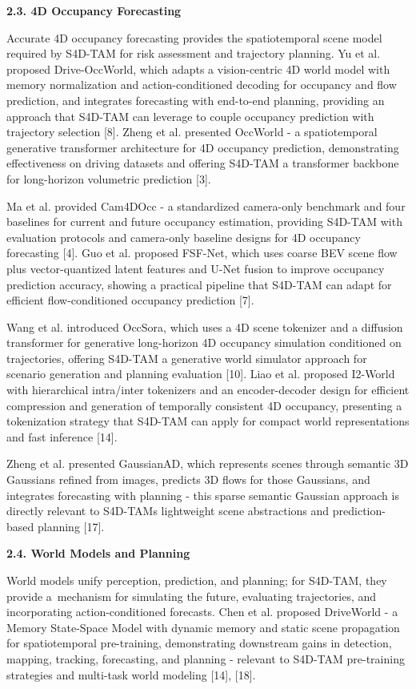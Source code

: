 \documentclass[
]{article}
\begin{document}
\textbf{2.3. 4D Occupancy Forecasting}

Accurate 4D occupancy forecasting provides the spatiotemporal scene
model required by S4D-TAM for risk assessment and trajectory planning.
Yu et al. proposed Drive-OccWorld, which adapts a vision-centric 4D
world model with memory normalization and action-conditioned decoding
for occupancy and flow prediction, and integrates forecasting with
end-to-end planning, providing an approach that S4D-TAM can leverage to
couple occupancy prediction with trajectory selection {[}8{]}. Zheng et
al. presented OccWorld - a spatiotemporal generative transformer
architecture for 4D occupancy prediction, demonstrating effectiveness on
driving datasets and offering S4D-TAM a transformer backbone for
long-horizon volumetric prediction {[}3{]}.

Ma et al. provided Cam4DOcc - a standardized camera-only benchmark and
four baselines for current and future occupancy estimation, providing
S4D-TAM with evaluation protocols and camera-only baseline designs for
4D occupancy forecasting {[}4{]}. Guo et al. proposed FSF-Net, which
uses coarse BEV scene flow plus vector-quantized latent features and
U-Net fusion to improve occupancy prediction accuracy, showing a
practical pipeline that S4D-TAM can adapt for efficient flow-conditioned
occupancy prediction {[}7{]}.

Wang et al. introduced OccSora, which uses a 4D scene tokenizer and a
diffusion transformer for generative long-horizon 4D occupancy
simulation conditioned on trajectories, offering S4D-TAM a generative
world simulator approach for scenario generation and planning evaluation
{[}10{]}. Liao et al. proposed I2-World with hierarchical intra/inter
tokenizers and an encoder-decoder design for efficient compression and
generation of temporally consistent 4D occupancy, presenting a
tokenization strategy that S4D-TAM can apply for compact world
representations and fast inference {[}14{]}.

Zheng et al. presented GaussianAD, which represents scenes through
semantic 3D Gaussians refined from images, predicts 3D flows for those
Gaussians, and integrates forecasting with planning - this sparse
semantic Gaussian approach is directly relevant to
S4D-TAM\textquotesingle s lightweight scene abstractions and
prediction-based planning {[}17{]}.

\textbf{2.4. World Models and Planning}

World models unify perception, prediction, and planning; for S4D-TAM,
they provide a~mechanism for simulating the future, evaluating
trajectories, and incorporating action-conditioned forecasts. Chen et
al. proposed DriveWorld - a Memory State-Space Model with dynamic memory
and static scene propagation for spatiotemporal pre-training,
demonstrating downstream gains in detection, mapping, tracking,
forecasting, and planning - relevant to S4D-TAM pre-training strategies
and multi-task world modeling {[}14{]}, {[}18{]}.
\end{document}
